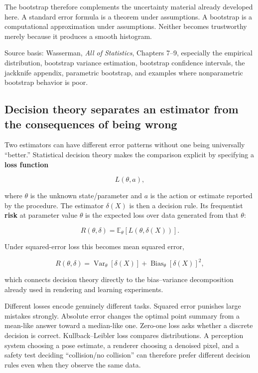 The bootstrap therefore complements the uncertainty material already developed here. A standard error formula is a theorem under assumptions. A bootstrap is a computational approximation under assumptions. Neither becomes trustworthy merely because it produces a smooth histogram.

Source basis: Wasserman, \emph{All of Statistics}, Chapters 7--9, especially the empirical distribution, bootstrap variance estimation, bootstrap confidence intervals, the jackknife appendix, parametric bootstrap, and examples where nonparametric bootstrap behavior is poor.

\subsection{Decision theory separates an estimator from the consequences of being wrong}\label{02-foundations-ii-ch030-decision-theory-separates-an-estimator-from-the-consequences-of-being-wrong}

\hypertarget{02-foundations-ii-ch030-decision-theory-separates-an-estimator-from-the-consequences-of-being-wrong}{}

Two estimators can have different error patterns without one being universally ``better.'' Statistical decision theory makes the comparison explicit by specifying a \textbf{loss function}

\[
L(\theta,a),
\]

where \(\theta\) is the unknown state/parameter and \(a\) is the action or estimate reported by the procedure. The estimator \(\delta(X)\) is then a decision rule. Its frequentist \textbf{risk} at parameter value \(\theta\) is the expected loss over data generated from that \(\theta\):

\[
R(\theta,\delta)
=
\mathbb E_\theta[
L(\theta,\delta(X))
].
\]

Under squared-error loss this becomes mean squared error,

\[
R(\theta,\delta)
=
\operatorname{Var}_\theta[\delta(X)]
+
\operatorname{Bias}_\theta[\delta(X)]^2,
\]

which connects decision theory directly to the bias--variance decomposition already used in rendering and learning experiments.

Different losses encode genuinely different tasks. Squared error punishes large mistakes strongly. Absolute error changes the optimal point summary from a mean-like answer toward a median-like one. Zero-one loss asks whether a discrete decision is correct. Kullback--Leibler loss compares distributions. A perception system choosing a pose estimate, a renderer choosing a denoised pixel, and a safety test deciding ``collision/no collision'' can therefore prefer different decision rules even when they observe the same data.

